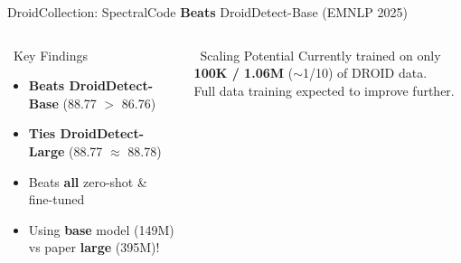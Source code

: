 \documentclass[aspectratio=169, 10pt]{beamer}
\begin{document}
\begin{frame}{DroidCollection: SpectralCode \textbf{Beats} DroidDetect-Base (EMNLP 2025)}
\begin{columns}[T]
\begin{exampleblock}{\faCheckCircle\ Key Findings}
\small
\begin{itemize}\setlength\itemsep{3pt}
    \item[\ding{51}] \textbf{Beats DroidDetect-Base} (88.77 $>$ 86.76)
    \item[\ding{51}] \textbf{Ties DroidDetect-Large} (88.77 $\approx$ 88.78)
    \item[\ding{51}] Beats \textbf{all} zero-shot \& fine-tuned
    \item[\faArrowRight] Using \textbf{base} model (149M) vs paper \textbf{large} (395M)!
\end{itemize}
\end{exampleblock}

\begin{alertblock}{\faStar\ Scaling Potential}
\small
Currently trained on only \textbf{100K / 1.06M} ($\sim$1/10) of DROID data.\\[3pt]
Full data training expected to improve further.
\end{alertblock}
\end{columns}
\end{frame}
\end{document}
